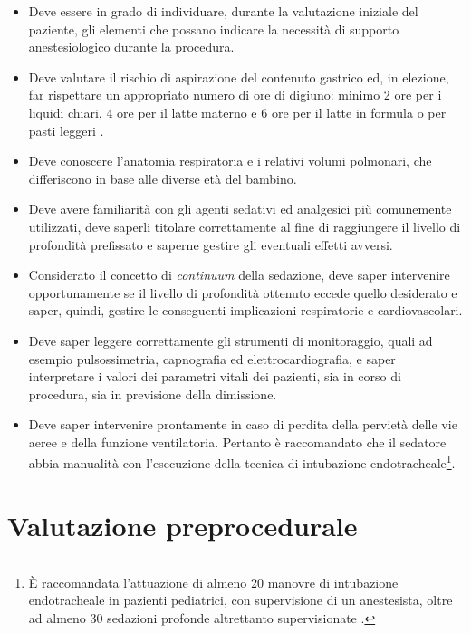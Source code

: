 \begin{itemize}
    \item Deve essere in grado di individuare, durante la valutazione iniziale del paziente, gli elementi che possano indicare la necessità di supporto anestesiologico durante la procedura.
    \item Deve valutare il rischio di aspirazione del contenuto gastrico ed, in elezione, far rispettare un appropriato numero di ore di digiuno: minimo 2 ore per i liquidi chiari, 4 ore per il latte materno e 6 ore per il latte in formula o per pasti leggeri \cite{Guidelines2019}. 
    \item Deve conoscere l'anatomia respiratoria e i relativi volumi polmonari, che differiscono in base alle diverse età del bambino. 
    \item Deve avere familiarità con gli agenti sedativi ed analgesici più comunemente utilizzati, deve saperli titolare correttamente al fine di raggiungere il livello di profondità prefissato e saperne gestire gli eventuali effetti avversi. 
    \item Considerato il concetto di \emph{continuum} della sedazione, deve saper intervenire opportunamente se il livello di profondità ottenuto eccede quello desiderato e saper, quindi, gestire le conseguenti implicazioni respiratorie e cardiovascolari. 
    \item Deve saper leggere correttamente gli strumenti di monitoraggio, quali ad esempio pulsossimetria, capnografia ed elettrocardiografia, e saper interpretare i valori dei parametri vitali dei pazienti, sia in corso di procedura, sia in previsione della dimissione. 
    \item Deve saper intervenire prontamente in caso di perdita della pervietà delle vie aeree e della funzione ventilatoria. Pertanto è raccomandato che il sedatore abbia manualità con l'esecuzione della tecnica di intubazione endotracheale\footnote{\`E raccomandata l'attuazione di almeno 20 manovre di intubazione endotracheale in pazienti pediatrici, con supervisione di un anestesista, oltre ad almeno 30 sedazioni profonde altrettanto supervisionate \cite{Simeupsedazione}.}.
\end{itemize}

\section{Valutazione preprocedurale}

